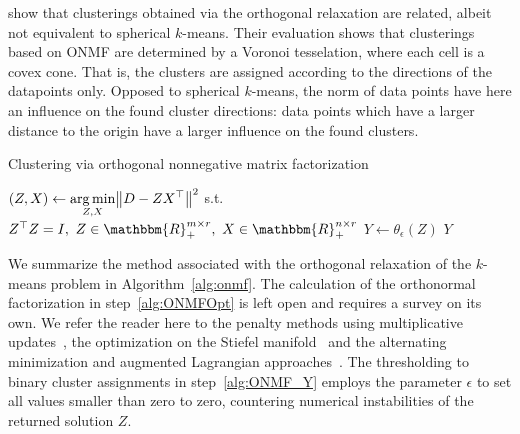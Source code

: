 \cite{pompili2014ONMF} show that  clusterings obtained via the orthogonal relaxation are related, albeit not equivalent to spherical $k$-means. Their evaluation shows that clusterings based on ONMF are determined by a Voronoi tesselation, where each cell is a covex cone. That is, the clusters are assigned according to the directions of the datapoints only. Opposed to spherical $k$-means, the norm of data points have here an influence on the found cluster directions: data points which have a larger distance to the origin have a larger influence on the found clusters.
\begin{algorithm}[t]
\caption{Clustering via orthogonal nonnegative matrix factorization} 
\begin{algorithmic}[1]
   
  \State $\displaystyle (Z,X)\gets \operatorname*{arg\,min}_{Z,X}\bigl\lVert D-ZX^\top\bigr\rVert ^2$ s.t. $Z^\top Z=I,\ Z\in\mathbbm{R}_+^{m\times r},\ X\in\mathbbm{R}_+^{n\times r}$\label{alg:ONMFOpt}
  \State $Y\gets \theta_\epsilon(Z)$\label{alg:ONMF_Y}
  \State \Return $Y$
  \EndFunction
\end{algorithmic}
\label{alg:onmf}
\end{algorithm}
We summarize the method associated with the orthogonal relaxation of the $k$-means problem in Algorithm~\ref{alg:onmf}. The calculation of the orthonormal factorization in step~\ref{alg:ONMFOpt} is left open and requires a survey on its own. We refer the reader here to the penalty methods using multiplicative updates~\citep{ding2006orthogonal, li2006relationships}, the optimization on the Stiefel manifold~\citep{yoo2010orthogonal} and the alternating minimization and augmented Lagrangian approaches~\citep{pompili2014ONMF}. The thresholding to binary cluster assignments in step~\ref{alg:ONMF_Y} employs the parameter $\epsilon$ to set all values smaller than zero to zero, countering numerical instabilities of the returned solution $Z$.
